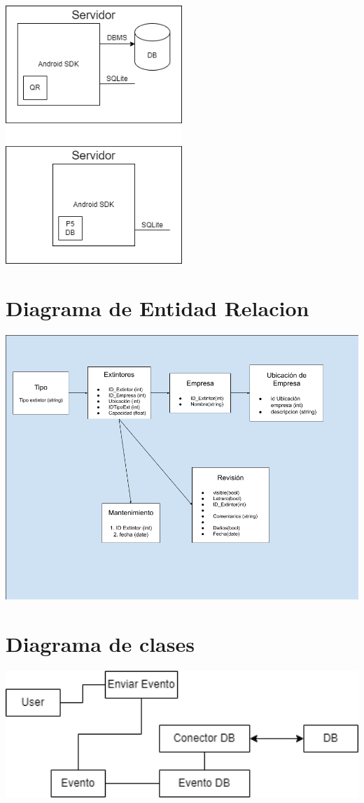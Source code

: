 \documentclass[a4paper,twoside,10pt]{report}
\begin{document}
		\includegraphics[width=0.50\textwidth]{APPExtntor.png}


\section{Diagrama de Entidad Relacion}

\includegraphics[width=1.0\textwidth]{Gaming.png}


\section{Diagrama de clases}


\includegraphics[width=1.0\textwidth]{ClasesExtintor.png}
\end{document}
